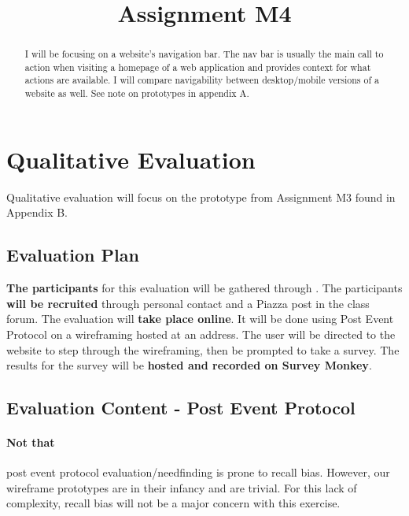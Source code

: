 

\title{Assignment M4\\}



\maketitle
\thispagestyle{fancy}

\begin{abstract}
I will be focusing on a website’s navigation bar. The nav bar is usually the main call to action when visiting a homepage of a web application and provides context for what actions are available. I will compare navigability between desktop/mobile versions of a website as well. See note on prototypes in appendix A.
\end{abstract}

\section{Qualitative Evaluation}
Qualitative evaluation will focus on the prototype from Assignment M3 found in Appendix B.

\subsection{Evaluation Plan}
\textbf{The participants} for this evaluation will be gathered through . The participants \textbf{will be recruited} through personal contact and a Piazza post in the class forum. The evaluation will \textbf{take place online}. It will be done using Post Event Protocol on a wireframing hosted at an address. The user will be directed to the website to step through the wireframing, then be prompted to take a survey. The results for the survey will be \textbf{hosted and recorded on Survey Monkey}.

\subsection{Evaluation Content - Post Event Protocol}

\paragraph{Not that} post event protocol evaluation/needfinding is prone to recall bias. However, our wireframe prototypes are in their infancy and are trivial. For this lack of complexity, recall bias will not be a major concern with this exercise.

